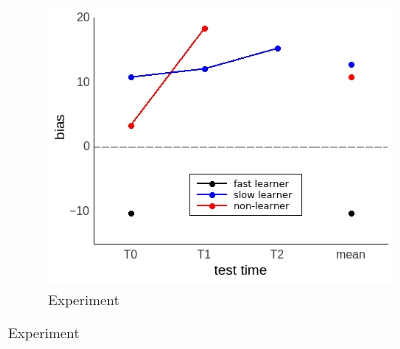 \documentclass[a4paper]{scrreprt}
\begin{document}
\begin{figure}
\centering
\begin{subfigure}[b]{0.49\textwidth}
        \includegraphics[width=\textwidth]{figs/sec3/individuals_diff_dat.jpeg}
        \caption{Experiment}
    \end{subfigure}


\end{figure}
\end{document}
